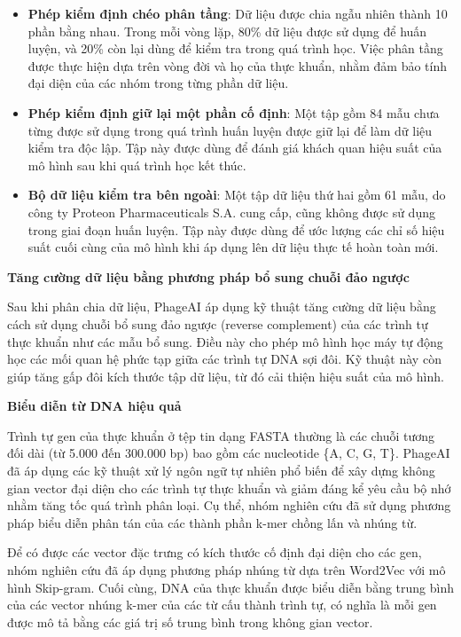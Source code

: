\begin{itemize}
    \item \textbf{Phép kiểm định chéo phân tầng}: Dữ liệu được chia ngẫu nhiên thành 10 phần bằng nhau. Trong mỗi vòng lặp, 80\% dữ liệu được sử dụng để huấn luyện, và 20\% còn lại dùng để kiểm tra trong quá trình học. Việc phân tầng được thực hiện dựa trên vòng đời và họ của thực khuẩn, nhằm đảm bảo tính đại diện của các nhóm trong từng phần dữ liệu.
    
    \item \textbf{Phép kiểm định giữ lại một phần cố định}: Một tập gồm 84 mẫu chưa từng được sử dụng trong quá trình huấn luyện được giữ lại để làm dữ liệu kiểm tra độc lập. Tập này được dùng để đánh giá khách quan hiệu suất của mô hình sau khi quá trình học kết thúc.
    
    \item \textbf{Bộ dữ liệu kiểm tra bên ngoài}: Một tập dữ liệu thứ hai gồm 61 mẫu, do công ty Proteon Pharmaceuticals S.A. cung cấp, cũng không được sử dụng trong giai đoạn huấn luyện. Tập này được dùng để ước lượng các chỉ số hiệu suất cuối cùng của mô hình khi áp dụng lên dữ liệu thực tế hoàn toàn mới.
\end{itemize}

\textbf{Tăng cường dữ liệu bằng phương pháp bổ sung chuỗi đảo ngược}

Sau khi phân chia dữ liệu, PhageAI áp dụng kỹ thuật tăng cường dữ liệu bằng cách sử dụng chuỗi bổ sung đảo ngược (reverse complement) của các trình tự thực khuẩn như các mẫu bổ sung. Điều này cho phép mô hình học máy tự động học các mối quan hệ phức tạp giữa các trình tự DNA sợi đôi. Kỹ thuật này còn giúp tăng gấp đôi kích thước tập dữ liệu, từ đó cải thiện hiệu suất của mô hình.

\textbf{Biểu diễn từ DNA hiệu quả}

Trình tự gen của thực khuẩn ở tệp tin dạng FASTA thường là các chuỗi tương đối dài (từ 5.000 đến 300.000 bp) bao gồm các nucleotide \{A, C, G, T\}. PhageAI đã áp dụng các kỹ thuật xử lý ngôn ngữ tự nhiên phổ biến để xây dựng không gian vector đại diện cho các trình tự thực khuẩn và giảm đáng kể yêu cầu bộ nhớ nhằm tăng tốc quá trình phân loại. Cụ thể, nhóm nghiên cứu đã sử dụng phương pháp biểu diễn phân tán của các thành phần k-mer chồng lấn và nhúng từ.

Để có được các vector đặc trưng có kích thước cố định đại diện cho các gen, nhóm nghiên cứu đã áp dụng phương pháp nhúng từ dựa trên Word2Vec với mô hình Skip-gram. Cuối cùng, DNA của thực khuẩn được biểu diễn bằng trung bình của các vector nhúng k-mer của các từ cấu thành trình tự, có nghĩa là mỗi gen được mô tả bằng các giá trị số trung bình trong không gian vector.

